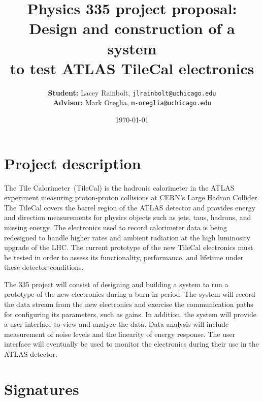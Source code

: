 \documentclass[12pt]{article}
\title{Physics 335 project proposal: \\
	Design and construction of a system \\ to test ATLAS TileCal electronics}
\author{\textbf{Student:} Lacey Rainbolt, \texttt{jlrainbolt@uchicago.edu} \\ \textbf{Advisor:} Mark Oreglia, \texttt{m-oreglia@uchicago.edu}}
\date{\today}
\begin{document}
\maketitle

\section*{Project description}

The Tile Calorimeter~(TileCal) is the hadronic calorimeter in the ATLAS experiment measuring proton-proton collisions at CERN's Large Hadron Collider.  The TileCal covers the barrel region of the ATLAS detector and provides energy and direction measurements for physics objects such as jets, taus, hadrons, and missing energy.  The electronics used to record calorimeter data is being redesigned to handle higher rates and ambient radiation at the high luminosity upgrade of the LHC.  The current prototype of the new TileCal electronics must be tested in order to assess its functionality, performance, and lifetime under these detector conditions.

The 335 project will consist of designing and building a system to run a prototype of the new electronics during a burn-in period.  The system will record the data stream from the new electronics and exercise the communication paths for configuring its parameters, such as gains.  In addition, the system will provide a user interface to view and analyze the data.  Data analysis will include measurement of noise levels and the linearity of energy response.   The user interface will eventually be used to monitor the electronics during their use in the ATLAS detector.

\section*{Signatures}
\end{document}
